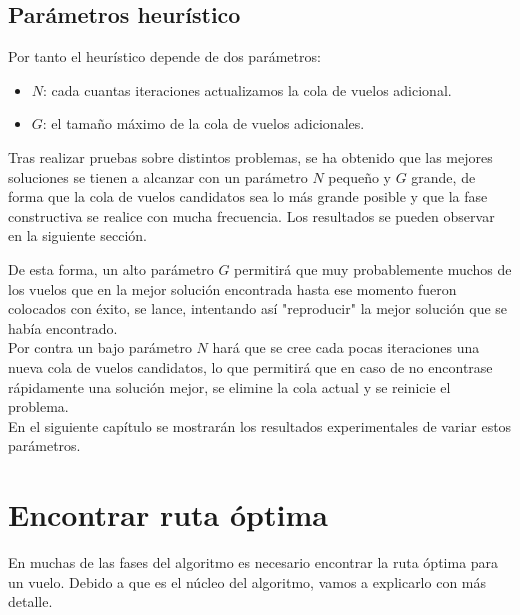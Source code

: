 \subsection{Parámetros heurístico}
Por tanto el heurístico depende de dos parámetros:
\begin{itemize}
	\item \textbf{$N$}: cada cuantas iteraciones actualizamos la cola de vuelos adicional.
	\item \textbf{$G$}: el tamaño máximo de la cola de vuelos adicionales.
\end{itemize}
Tras realizar pruebas sobre distintos problemas, se ha obtenido que las mejores soluciones se tienen a alcanzar con un parámetro $N$ pequeño y $G$ grande, de forma que la cola de vuelos candidatos sea lo más grande posible y que la fase constructiva se realice con mucha frecuencia. Los resultados se pueden observar en la siguiente sección.

De esta forma, un alto parámetro $G$ permitirá que muy probablemente muchos de los vuelos que en la mejor solución encontrada hasta ese momento fueron colocados con éxito, se lance, intentando así "reproducir" la mejor solución que se había encontrado. \\
Por contra un bajo parámetro $N$ hará que se cree cada pocas iteraciones una nueva cola de vuelos candidatos, lo que permitirá que en caso de no encontrase rápidamente una solución mejor, se elimine la cola actual y se reinicie el problema.\\
En el siguiente capítulo se mostrarán los resultados experimentales de variar estos parámetros.


\section{Encontrar ruta óptima}
En muchas de las fases del algoritmo es necesario encontrar la ruta óptima para un vuelo. Debido a que es el núcleo del algoritmo, vamos a explicarlo con más detalle.
